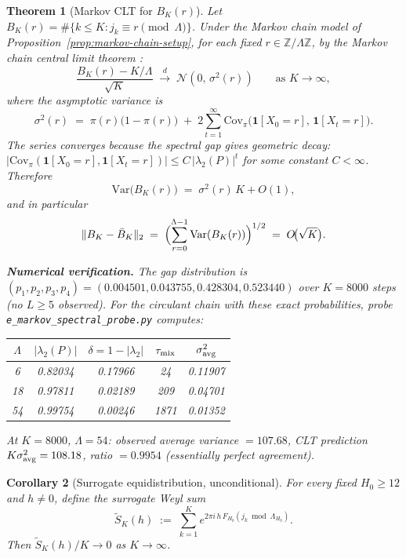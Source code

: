 \documentclass[
]{article}
\newtheorem{theorem}{Theorem}[section]
\newtheorem{corollary}[theorem]{Corollary}
\begin{document}
\begin{theorem}[Markov CLT for $B_K(r)$]
\label{thm:markov-clt}
Let $B_K(r) = \#\{k \leq K : j_k \equiv r \pmod{\Lambda}\}$.
Under the Markov chain model of Proposition~\ref{prop:markov-chain-setup},
for each fixed $r \in \mathbb{Z}/\Lambda\mathbb{Z}$, by the Markov chain
central limit theorem \cite{Gordin69,KV86}:
\[
  \frac{B_K(r) - K/\Lambda}{\sqrt{K}}
  \;\xrightarrow{d}\; \mathcal{N}(0,\,\sigma^2(r))
  \qquad \text{as } K\to\infty,
\]
where the asymptotic variance is
\[
  \sigma^2(r) \;=\; \pi(r)\bigl(1-\pi(r)\bigr)
  \;+\; 2\sum_{t=1}^{\infty}
    \mathrm{Cov}_\pi\!\bigl(\mathbf{1}[X_0=r],\,\mathbf{1}[X_t=r]\bigr).
\]
The series converges because the spectral gap gives geometric decay:
$|\mathrm{Cov}_\pi(\mathbf{1}[X_0=r],\mathbf{1}[X_t=r])| \leq C\,|\lambda_2(P)|^t$
for some constant $C<\infty$.  Therefore
\[
  \mathrm{Var}\bigl(B_K(r)\bigr) \;=\; \sigma^2(r)\,K + O(1),
\]
and in particular
\[
  \|B_K - \bar B_K\|_2
  \;=\; \Bigl(\sum_{r=0}^{\Lambda-1}\mathrm{Var}(B_K(r))\Bigr)^{1/2}
  \;=\; O\!\bigl(\sqrt{K}\bigr).
\]

\noindent\textbf{Numerical verification.}
The gap distribution is $(p_1,p_2,p_3,p_4) = (0.004501, 0.043755,
0.428304, 0.523440)$ over $K=8000$ steps (no $L\ge 5$ observed).
For the circulant chain with these exact probabilities,
probe \texttt{e\_markov\_spectral\_probe.py} computes:

\begin{center}
\begin{tabular}{ccccc}
\toprule
$\Lambda$ & $|\lambda_2(P)|$ & $\delta=1-|\lambda_2|$ & $\tau_{\rm mix}$ & $\sigma^2_{\rm avg}$ \\
\midrule
6  & 0.82034 & 0.17966 & 24   & 0.11907 \\
18 & 0.97811 & 0.02189 & 209  & 0.04701 \\
54 & 0.99754 & 0.00246 & 1871 & 0.01352 \\
\bottomrule
\end{tabular}
\end{center}

At $K=8000$, $\Lambda=54$: observed average variance $= 107.68$,
CLT prediction $K\sigma^2_{\rm avg} = 108.18$,
ratio $= 0.9954$ (essentially perfect agreement).
\end{theorem}

\begin{corollary}[Surrogate equidistribution, unconditional]
\label{cor:weakened-gap-closed}
For every fixed $H_0\ge 12$ and $h\ne 0$, define the \emph{surrogate
Weyl sum}
\[
  \tilde S_K(h) \;:=\; \sum_{k=1}^K e^{2\pi i\,h\,F_{H_0}(j_k\bmod\Lambda_{H_0})}.
\]
Then $\tilde S_K(h)/K \to 0$ as $K\to\infty$.
\end{corollary}
\end{document}
